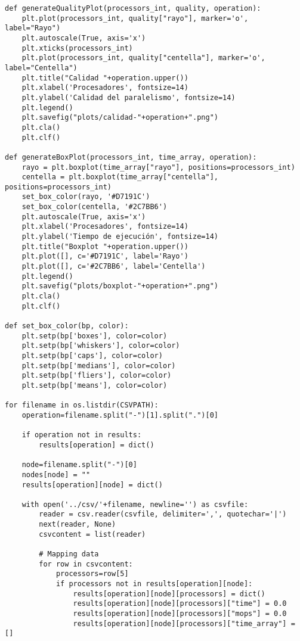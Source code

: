 \begin{center}
\begin{footnotesize}
\begin{verbatim}
def generateQualityPlot(processors_int, quality, operation): 
    plt.plot(processors_int, quality["rayo"], marker='o', label="Rayo")
    plt.autoscale(True, axis='x')
    plt.xticks(processors_int)
    plt.plot(processors_int, quality["centella"], marker='o', label="Centella")
    plt.title("Calidad "+operation.upper())
    plt.xlabel('Procesadores', fontsize=14)
    plt.ylabel('Calidad del paralelismo', fontsize=14)
    plt.legend()
    plt.savefig("plots/calidad-"+operation+".png")
    plt.cla()
    plt.clf()

def generateBoxPlot(processors_int, time_array, operation):
    rayo = plt.boxplot(time_array["rayo"], positions=processors_int)
    centella = plt.boxplot(time_array["centella"], positions=processors_int)
    set_box_color(rayo, '#D7191C') 
    set_box_color(centella, '#2C7BB6')
    plt.autoscale(True, axis='x')
    plt.xlabel('Procesadores', fontsize=14)
    plt.ylabel('Tiempo de ejecución', fontsize=14)
    plt.title("Boxplot "+operation.upper())
    plt.plot([], c='#D7191C', label='Rayo')
    plt.plot([], c='#2C7BB6', label='Centella')
    plt.legend()
    plt.savefig("plots/boxplot-"+operation+".png")
    plt.cla()
    plt.clf()

def set_box_color(bp, color):
    plt.setp(bp['boxes'], color=color)
    plt.setp(bp['whiskers'], color=color)
    plt.setp(bp['caps'], color=color)
    plt.setp(bp['medians'], color=color)
    plt.setp(bp['fliers'], color=color)
    plt.setp(bp['means'], color=color)
    
for filename in os.listdir(CSVPATH):
    operation=filename.split("-")[1].split(".")[0]
    
    if operation not in results:
        results[operation] = dict()
    
    node=filename.split("-")[0]
    nodes[node] = ""
    results[operation][node] = dict()

    with open('../csv/'+filename, newline='') as csvfile:
        reader = csv.reader(csvfile, delimiter=',', quotechar='|')
        next(reader, None)
        csvcontent = list(reader)

        # Mapping data
        for row in csvcontent:
            processors=row[5]
            if processors not in results[operation][node]:
                results[operation][node][processors] = dict()
                results[operation][node][processors]["time"] = 0.0
                results[operation][node][processors]["mops"] = 0.0
                results[operation][node][processors]["time_array"] = []
                

\end{verbatim}
\end{footnotesize}
\end{center}
